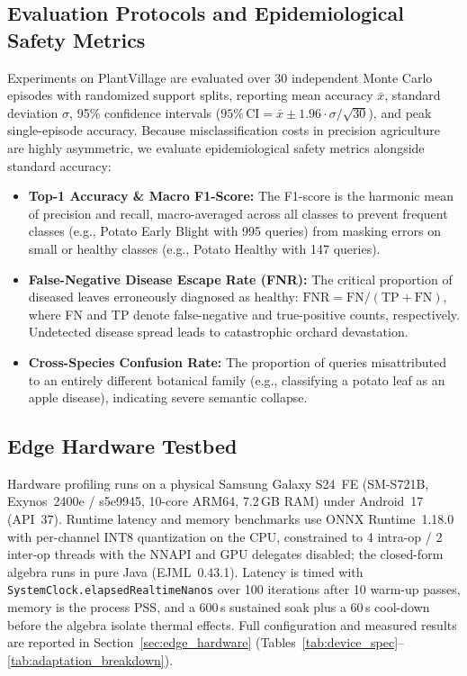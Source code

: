 \documentclass[preprint,12pt]{elsarticle}
\begin{document}
\subsection{Evaluation Protocols and Epidemiological Safety Metrics}
\label{sec:metrics}
Experiments on PlantVillage are evaluated over 30 independent Monte Carlo episodes with randomized support splits, reporting mean accuracy $\bar{x}$, standard deviation $\sigma$, 95\% confidence intervals ($95\%\,\text{CI} = \bar{x} \pm 1.96 \cdot \sigma / \sqrt{30}$), and peak single-episode accuracy. Because misclassification costs in precision agriculture are highly asymmetric, we evaluate epidemiological safety metrics alongside standard accuracy:
\begin{itemize}
    \item \textbf{Top-1 Accuracy \& Macro F1-Score:} The F1-score is the harmonic mean of precision and recall, macro-averaged across all classes to prevent frequent classes (e.g., Potato Early Blight with 995 queries) from masking errors on small or healthy classes (e.g., Potato Healthy with 147 queries).
    \item \textbf{False-Negative Disease Escape Rate (FNR):} The critical proportion of diseased leaves erroneously diagnosed as healthy: $\text{FNR} = \text{FN} / (\text{TP} + \text{FN})$, where FN and TP denote false-negative and true-positive counts, respectively. Undetected disease spread leads to catastrophic orchard devastation.
    \item \textbf{Cross-Species Confusion Rate:} The proportion of queries misattributed to an entirely different botanical family (e.g., classifying a potato leaf as an apple disease), indicating severe semantic collapse.
\end{itemize}

\subsection{Edge Hardware Testbed}
Hardware profiling runs on a physical Samsung Galaxy S24~FE (SM-S721B, Exynos~2400e / s5e9945, 10-core ARM64, 7.2\,GB RAM) under Android~17 (API~37). Runtime latency and memory benchmarks use ONNX Runtime~1.18.0 with per-channel INT8 quantization on the CPU, constrained to 4 intra-op / 2 inter-op threads with the NNAPI and GPU delegates disabled; the closed-form algebra runs in pure Java (EJML~0.43.1). Latency is timed with \texttt{SystemClock.elapsedRealtimeNanos} over 100 iterations after 10 warm-up passes, memory is the process PSS, and a 600\,s sustained soak plus a 60\,s cool-down before the algebra isolate thermal effects. Full configuration and measured results are reported in Section~\ref{sec:edge_hardware} (Tables~\ref{tab:device_spec}--\ref{tab:adaptation_breakdown}).
\end{document}
